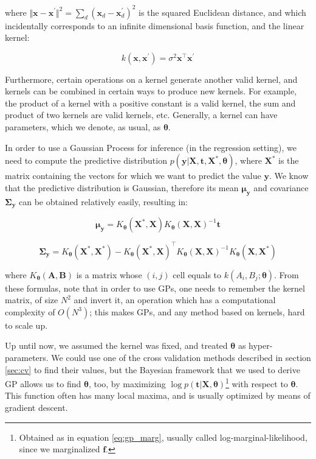 \documentclass[a4paper,11pt]{kth-mag}
\begin{document}
\noindent where $\Vert\bm x-\bm x^\prime\Vert^2=\sum_d(\bm x_d-\bm x_d^\prime)^2$ is the squared Euclidean distance, and which incidentally corresponds to an infinite dimensional basis function, and the linear kernel:

\begin{equation}
k(\bm x, \bm x^\prime)=\sigma^2\bm x^\intercal\bm x^\prime
\end{equation}

Furthermore, certain operations on a kernel generate another valid kernel, and kernels can be combined in certain ways to produce new kernels. For example, the product of a kernel with a positive constant is a valid kernel, the sum and product of two kernels are valid kernels, etc. Generally, a kernel can have parameters, which we denote, as usual, as $\bm\theta$.

In order to use a Gaussian Process for inference (in the regression setting), we need to compute the predictive distribution $p(\bm y\vert\bm X, \bm t, \bm X^*,\bm\theta) $, where $\bm X^*$ is the matrix containing the vectors for which we want to predict the value $\bm y$. We know that the predictive distribution is Gaussian, therefore its mean $\bm\mu_{\bm y}$ and covariance $\bm\Sigma_{\bm y}$ can be obtained relatively easily, resulting in:

\begin{equation}
\label{eq:gp_pred_mean}
\bm\mu_{\bm y}=K_{\bm\theta}(\bm X^*,\bm X) K_{\bm\theta}(\bm X,\bm X)^{-1}\bm t
\end{equation}

\begin{equation}
\bm\Sigma_{\bm y}=K_{\bm\theta}(\bm X^*,\bm X^*)-K_{\bm\theta}(\bm X^*,\bm X)^\intercal K_{\bm\theta}(\bm X, \bm X)^{-1}K_{\bm\theta}(\bm X,\bm X^*)
\end{equation}

\noindent where $K_{\bm\theta}(\bm A,\bm B)$ is a matrix whose $(i,j)$ cell equals to $k(A_i,B_j;\bm\theta)$. From these formulas, note that in order to use GPs, one needs to remember the kernel matrix, of size $N^2$ and invert it, an operation which has a computational complexity of $O(N^3)$; this makes GPs, and any method based on kernels, hard to scale up.

Up until now, we assumed the kernel was fixed, and treated $\bm\theta$ as hyper-parameters. We could use one of the cross validation methods described in section \ref{sec:cv} to find their values, but the Bayesian framework that we used to derive GP allows us to find $\bm\theta$, too, by maximizing $\log p(\bm t\vert\bm X,\bm\theta)$\footnote{Obtained as in equation \ref{eq:gp_marg}, usually called log-marginal-likelihood, since we marginalized $\bm f$.} with respect to $\bm\theta$. This function often has many local maxima, and is usually optimized by means of gradient descent.
\end{document}
